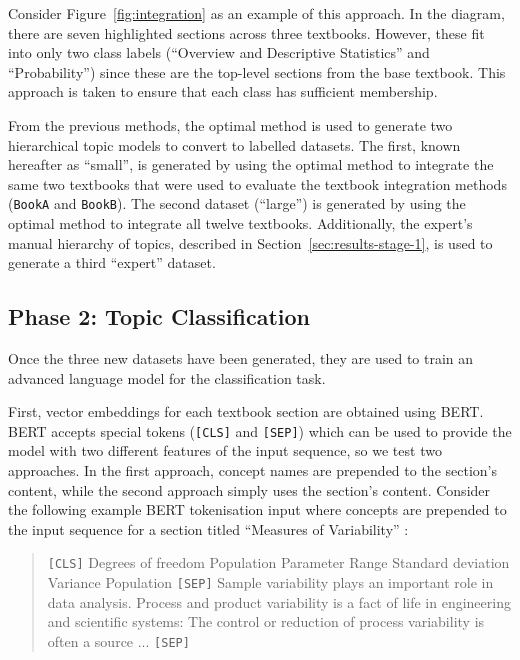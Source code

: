 \documentclass[twocolumn]{article}
\def\code#1{\texttt{#1}}
\begin{document}
Consider Figure~\ref{fig:integration} as an example of this approach. In the diagram, there are seven highlighted sections across three textbooks. However, these fit into only two class labels (“Overview and Descriptive Statistics” and “Probability”) since these are the top-level sections from the base textbook. This approach is taken to ensure that each class has sufficient membership.

From the previous methods, the optimal method is used to generate two hierarchical topic models to convert to labelled datasets. The first, known hereafter as ``small'', is generated by using the optimal method to integrate the same two textbooks that were used to evaluate the textbook integration methods (\code{BookA} and \code{BookB}). The second dataset (``large'') is generated by using the optimal method to integrate all twelve textbooks. Additionally, the expert's manual hierarchy of topics, described in Section~\ref{sec:results-stage-1}, is used to generate a third ``expert'' dataset.

\subsection{Phase 2: Topic Classification} \label{sec:topic-classification}
Once the three new datasets have been generated, they are used to train an advanced language model for the classification task. 

First, vector embeddings for each textbook section are obtained using BERT. BERT accepts special tokens (\code{[CLS]} and \code{[SEP]}) which can be used to provide the model with two different features of the input sequence, so we test two approaches. In the first approach, concept names are prepended to the section’s content, while the second approach simply uses the section’s content. Consider the following example BERT tokenisation input where concepts are prepended to the input sequence for a section titled ``Measures of Variability'' :

\begin{quotation}\noindent\small
\code{[CLS]}
Degrees of freedom \enspace
Population \enspace
Parameter \enspace
Range \enspace
Standard deviation \enspace
Variance \enspace
Population
\code{[SEP]}
Sample variability plays an important role in data analysis. Process and product variability is a fact of life in engineering and scientific systems: The control or reduction of process variability is often a source ...
\code{[SEP]}
\end{quotation}
\end{document}
